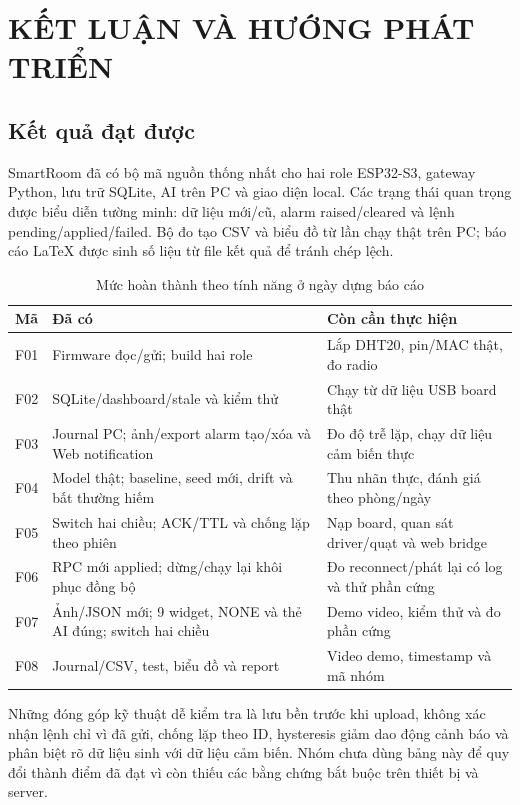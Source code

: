 \chapter{KẾT LUẬN VÀ HƯỚNG PHÁT TRIỂN}
\section{Kết quả đạt được}
SmartRoom đã có bộ mã nguồn thống nhất cho hai role ESP32-S3, gateway Python, lưu trữ SQLite, AI trên PC và giao diện local. Các trạng thái quan trọng được biểu diễn tường minh: dữ liệu mới/cũ, alarm raised/cleared và lệnh pending/applied/failed. Bộ đo tạo CSV và biểu đồ từ lần chạy thật trên PC; báo cáo LaTeX được sinh số liệu từ file kết quả để tránh chép lệch.

\begin{table}[H]\centering\small
\caption{Mức hoàn thành theo tính năng ở ngày dựng báo cáo}
\begin{tabular}{P{1cm}P{6.2cm}P{7.2cm}}
\toprule Mã & Đã có & Còn cần thực hiện \\ \midrule
F01 & Firmware đọc/gửi; build hai role & Lắp DHT20, pin/MAC thật, đo radio \\
F02 & SQLite/dashboard/stale và kiểm thử & Chạy từ dữ liệu USB board thật \\
F03 & Journal PC; ảnh/export alarm tạo/xóa và Web notification & Đo độ trễ lặp, chạy dữ liệu cảm biến thực \\
F04 & Model thật; baseline, seed mới, drift và bất thường hiếm & Thu nhãn thực, đánh giá theo phòng/ngày \\
F05 & Switch hai chiều; ACK/TTL và chống lặp theo phiên & Nạp board, quan sát driver/quạt và web bridge \\
F06 & RPC mới applied; dừng/chạy lại khôi phục đồng bộ & Đo reconnect/phát lại có log và thử phần cứng \\
F07 & Ảnh/JSON mới; 9 widget, NONE và thẻ AI đúng; switch hai chiều & Demo video, kiểm thử và đo phần cứng \\
F08 & Journal/CSV, test, biểu đồ và report & Video demo, timestamp và mã nhóm \\
\bottomrule
\end{tabular}
\end{table}

Những đóng góp kỹ thuật dễ kiểm tra là lưu bền trước khi upload, không xác nhận lệnh chỉ vì đã gửi, chống lặp theo ID, hysteresis giảm dao động cảnh báo và phân biệt rõ dữ liệu sinh với dữ liệu cảm biến. Nhóm chưa dùng bảng này để quy đổi thành điểm đã đạt vì còn thiếu các bằng chứng bắt buộc trên thiết bị và server.

